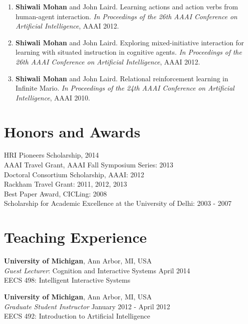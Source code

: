 \documentclass[margin,line,11pt]{res}
\begin{document}
\begin{resume}
\begin{enumerate}[label=\lbrack A\arabic*\rbrack,leftmargin=*]
                  \item \textbf{Shiwali Mohan} and John Laird. Learning actions and action verbs from human-agent interaction. \emph{In
                    Proceedings of the 26th AAAI Conference on Artificial Intelligence}, AAAI 2012.

                  \item \textbf{Shiwali Mohan} and John Laird. Exploring mixed-initiative interaction for learning with situated instruction in cognitive agents. \emph{In Proceedings of the 26th AAAI Conference on Artificial Intelligence}, AAAI 2012.

                  \item \textbf{Shiwali Mohan} and John Laird. Relational reinforcement learning in Infinite Mario. \emph{In Proceedings of the
                    24th AAAI Conference on Artificial Intelligence}, AAAI 2010.
                  \end{enumerate}

                  \section{\sc Honors and Awards} 
                  HRI Pioneers Scholarship, 2014\\
                  AAAI Travel Grant, AAAI Fall Symposium Series: 2013\\
                  Doctoral Consortium Scholarship, AAAI: 2012 \\
                  Rackham Travel Grant: 2011, 2012, 2013 \\
                  Best Paper Award, CICLing: 2008 \\
                  Scholarship for Academic Excellence at the University of Delhi: 2003 - 2007 

                  \section{\sc Teaching Experience}
                  \textbf{University of Michigan}, Ann Arbor, MI, USA \\
                  \emph{Guest Lecturer}: Cognition and Interactive Systems \hfill April 2014 \\
                  EECS 498: Intelligent Interactive Systems

                  \textbf{University of Michigan}, Ann Arbor, MI, USA \\
                  \emph{Graduate Student Instructor} \hfill January 2012 - April 2012 \\
                  EECS 492: Introduction to Artificial Intelligence


\end{resume}
\end{document}
